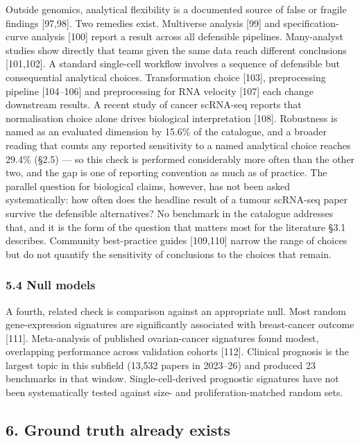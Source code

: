 \documentclass[11pt]{article}
\begin{document}
Outside genomics, analytical flexibility is a documented source of false
or fragile findings {[}97,98{]}. Two remedies exist. Multiverse analysis
{[}99{]} and specification-curve analysis {[}100{]} report a result
across all defensible pipelines. Many-analyst studies show directly that
teams given the same data reach different conclusions {[}101,102{]}. A
standard single-cell workflow involves a sequence of defensible but
consequential analytical choices. Transformation choice {[}103{]},
preprocessing pipeline {[}104--106{]} and preprocessing for RNA velocity
{[}107{]} each change downstream results. A recent study of cancer
scRNA-seq reports that normalisation choice alone drives biological
interpretation {[}108{]}. Robustness is named as an evaluated dimension
by 15.6\% of the catalogue, and a broader reading that counts any
reported sensitivity to a named analytical choice reaches 29.4\% (§2.5)
--- so this check is performed considerably more often than the other
two, and the gap is one of reporting convention as much as of practice.
The parallel question for biological claims, however, has not been asked
systematically: how often does the headline result of a tumour scRNA-seq
paper survive the defensible alternatives? No benchmark in the catalogue
addresses that, and it is the form of the question that matters most for
the literature §3.1 describes. Community best-practice guides
{[}109,110{]} narrow the range of choices but do not quantify the
sensitivity of conclusions to the choices that remain.

\subsubsection{5.4 Null models}\label{null-models}

A fourth, related check is comparison against an appropriate null. Most
random gene-expression signatures are significantly associated with
breast-cancer outcome {[}111{]}. Meta-analysis of published
ovarian-cancer signatures found modest, overlapping performance across
validation cohorts {[}112{]}. Clinical prognosis is the largest topic in
this subfield (13,532 papers in 2023--26) and produced 23 benchmarks in
that window. Single-cell-derived prognostic signatures have not been
systematically tested against size- and proliferation-matched random
sets.

\subsection{6. Ground truth already
exists}\label{ground-truth-already-exists}
\end{document}
